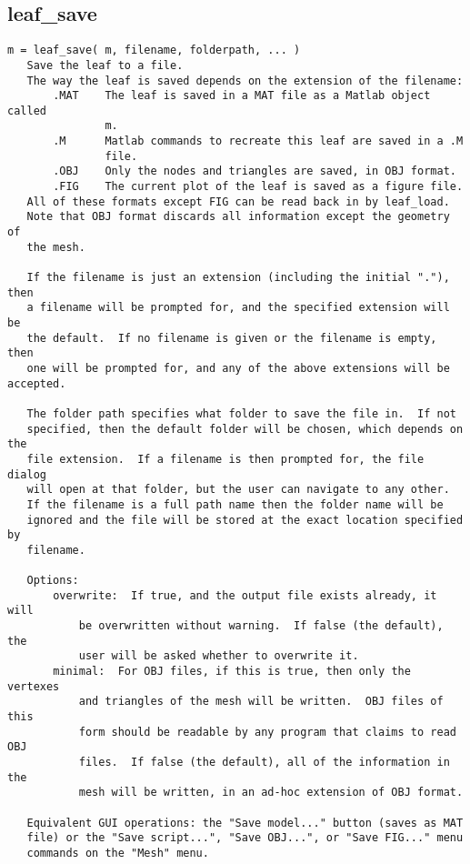 \subsection{leaf\_save}\label{section-leaf-save}

\begin{verbatim}
m = leaf_save( m, filename, folderpath, ... )
   Save the leaf to a file.
   The way the leaf is saved depends on the extension of the filename:
       .MAT    The leaf is saved in a MAT file as a Matlab object called
               m.
       .M      Matlab commands to recreate this leaf are saved in a .M
               file.
       .OBJ    Only the nodes and triangles are saved, in OBJ format.
       .FIG    The current plot of the leaf is saved as a figure file.
   All of these formats except FIG can be read back in by leaf_load.
   Note that OBJ format discards all information except the geometry of
   the mesh.

   If the filename is just an extension (including the initial "."), then
   a filename will be prompted for, and the specified extension will be
   the default.  If no filename is given or the filename is empty, then
   one will be prompted for, and any of the above extensions will be accepted.

   The folder path specifies what folder to save the file in.  If not
   specified, then the default folder will be chosen, which depends on the
   file extension.  If a filename is then prompted for, the file dialog
   will open at that folder, but the user can navigate to any other.
   If the filename is a full path name then the folder name will be
   ignored and the file will be stored at the exact location specified by
   filename.

   Options:
       overwrite:  If true, and the output file exists already, it will
           be overwritten without warning.  If false (the default), the
           user will be asked whether to overwrite it.
       minimal:  For OBJ files, if this is true, then only the vertexes
           and triangles of the mesh will be written.  OBJ files of this
           form should be readable by any program that claims to read OBJ
           files.  If false (the default), all of the information in the
           mesh will be written, in an ad-hoc extension of OBJ format.

   Equivalent GUI operations: the "Save model..." button (saves as MAT
   file) or the "Save script...", "Save OBJ...", or "Save FIG..." menu
   commands on the "Mesh" menu.
\end{verbatim}

